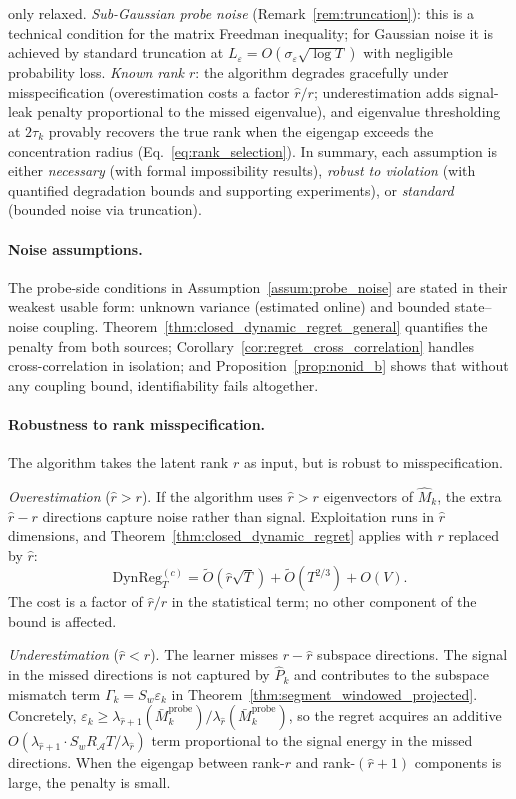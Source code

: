 \documentclass{article}
\newcommand{\cA}{\mathcal{A}}
\newcommand{\DynReg}{\mathrm{DynReg}}
\begin{document}
  only relaxed.
  \emph{Sub-Gaussian probe noise} (Remark~\ref{rem:truncation}):
  this is a technical condition for the matrix Freedman inequality; for
  Gaussian noise it is achieved by standard truncation at
  $L_\varepsilon = O(\sigma_\varepsilon \sqrt{\log T})$ with negligible
  probability loss.
  \emph{Known rank $r$}: the algorithm degrades gracefully under
  misspecification (overestimation costs a factor $\hat{r}/r$;
  underestimation adds signal-leak penalty proportional to the missed
  eigenvalue), and eigenvalue thresholding at $2\tau_k$ provably
  recovers the true rank when the eigengap exceeds the concentration
  radius (Eq.~\eqref{eq:rank_selection}).
  In summary, each assumption is either \emph{necessary}
  (with formal impossibility results), \emph{robust to violation}
  (with quantified degradation bounds and supporting experiments), or
  \emph{standard} (bounded noise via truncation).
\paragraph{Noise assumptions.}
The probe-side conditions in Assumption~\ref{assum:probe_noise} are stated in their weakest usable form: unknown variance (estimated online) and bounded state--noise coupling. Theorem~\ref{thm:closed_dynamic_regret_general} quantifies the penalty from both sources; Corollary~\ref{cor:regret_cross_correlation} handles cross-correlation in isolation; and Proposition~\ref{prop:nonid_b} shows that without any coupling bound, identifiability fails altogether.



 \paragraph{Robustness to rank misspecification.}
  The algorithm takes the latent rank $r$ as input, but is robust to misspecification.

  \emph{Overestimation} ($\hat r > r$).
  If the algorithm uses $\hat r > r$ eigenvectors of $\widehat M_k$,
  the extra $\hat r - r$ directions capture noise rather than signal.
  Exploitation runs in $\hat r$ dimensions, and
  Theorem~\ref{thm:closed_dynamic_regret} applies with $r$ replaced
  by $\hat r$:
  \[
  \DynReg_T^{(c)}
  = \widetilde O(\hat r\sqrt{T}) + \widetilde O(T^{2/3}) + O(V).
  \]
  The cost is a factor of $\hat r / r$ in the statistical term;
  no other component of the bound is affected.

  \emph{Underestimation} ($\hat r < r$).
  The learner misses $r - \hat r$ subspace directions.  The signal
  in the missed directions is not captured by $\widehat P_k$ and
  contributes to the subspace mismatch term $\Gamma_k = S_w \varepsilon_k$
  in Theorem~\ref{thm:segment_windowed_projected}.  Concretely,
  $\varepsilon_k \ge \lambda_{\hat r+1}(\bar M_k^{\mathrm{probe}})
  / \lambda_{\hat r}(\bar M_k^{\mathrm{probe}})$, so the regret acquires
  an additive $O(\lambda_{\hat r+1} \cdot S_w R_{\cA} T / \lambda_{\hat r})$
  term proportional to the signal energy in the missed directions.
  When the eigengap between rank-$r$ and rank-$(\hat r{+}1)$ components
  is large, the penalty is small.
\end{document}
